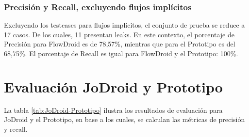 \subsubsection{Precisión y Recall, excluyendo flujos implícitos}
Excluyendo los testcases para flujos implícitos, el conjunto de prueba se reduce
a 17 casos. De los cuales, 11 presentan leaks.\newline 
En este contexto, el porcentaje de Precisión para FlowDroid es de 78,57\%,
mientras que para el Prototipo es del 68,75\%. El porcentaje de Recall es igual
para FlowDroid y el Prototipo: 100\%.


\section{Evaluación JoDroid y Prototipo}
La tabla \ref{tab:JoDroid-Prototipo} ilustra los resultados de evaluación para JoDroid y el
Prototipo, en base a los cuales, se calculan las métricas de precisión y recall. 
\label{subsec:jvsp}
